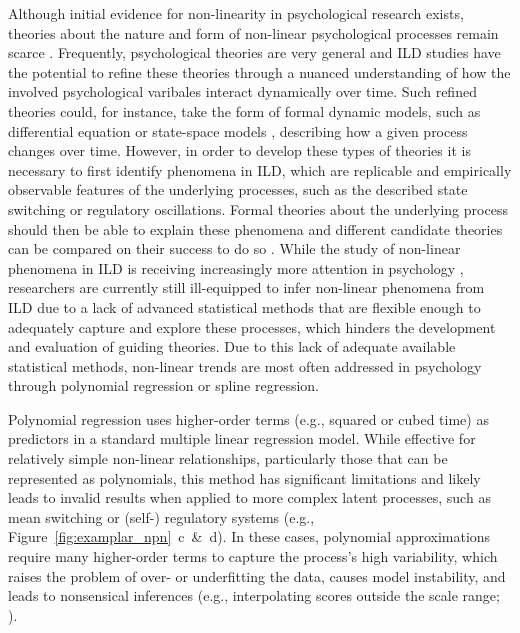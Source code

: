 \documentclass[jou, floatsintext]{apa7}
\begin{document}
Although initial evidence for non-linearity in psychological research exists,
theories about the nature and form of non-linear psychological processes remain
scarce \parencite{tan_time-varying_2011}. Frequently, psychological theories
are very general \parencite{oberauer_addressing_2019} and ILD studies have the
potential to refine these theories through a nuanced understanding of how the
involved psychological varibales interact dynamically over time. Such refined
theories could, for instance, take the form of formal dynamic models, such as
differential equation \parencite{cooper_dynamical_2012} or state-space models
\parencite{durbin_time_2012}, describing how a given process changes over time.
However, in order to develop these types of theories it is necessary to first
identify phenomena in ILD, which are replicable and empirically observable
features of the underlying processes, such as the described state switching or
regulatory oscillations. Formal theories about the underlying process should
then be able to explain these phenomena and different candidate theories can be
compared on their success to do so \parencite{borsboom_theory_2021}. While the
study of non-linear phenomena in ILD is receiving increasingly more attention
in psychology \parencite{cui_unlocking_2023,humberg_estimating_2024},
researchers are currently still ill-equipped to infer non-linear phenomena from
ILD due to a lack of advanced statistical methods that are flexible enough to
adequately capture and explore these processes, which hinders the development
and evaluation of guiding theories. Due to this lack of adequate available
statistical methods, non-linear trends are most often addressed in psychology
through polynomial regression or spline regression.

Polynomial regression \parencite{jebb_time_2015} uses higher-order terms (e.g.,
squared or cubed time) as predictors in a standard multiple linear regression
model. While effective for relatively simple non-linear relationships,
particularly those that can be represented as polynomials, this method has
significant limitations and likely leads to invalid results when applied to
more complex latent processes, such as mean switching or (self-) regulatory
systems (e.g., Figure~\ref{fig:examplar_npn}~c~\&~d). In these cases,
polynomial approximations require many higher-order terms to capture the
process's high variability, which raises the problem of over- or underfitting
the data, causes model instability, and leads to nonsensical inferences (e.g.,
interpolating scores outside the scale range;
\textcite{boyd_divergence_2009,harrell_general_2001}).
\end{document}
